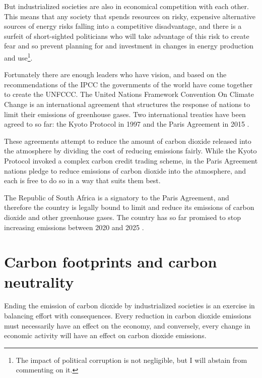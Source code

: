 But industrialized societies are also in economical competition with each other.
This means that any society that spends resources on risky, expensive
alternative sources of energy risks falling into a competitive disadvantage, and
there is a surfeit of short-sighted politicians who will take advantage of
this risk to create fear and so prevent planning for and investment in
changes in energy production and use\footnote{The impact of political corruption
is not negligible, but I will abstain from commenting on it.}.

Fortunately there are enough leaders who have vision, and based on the
recommendations of the IPCC the governments of the world have come together to
create the UNFCCC. The United Nations Framework Convention On Climate Change is
an international agreement that structures the response of nations to limit
their emissions of greenhouse gases. Two international treaties have been agreed
to so far: the Kyoto Protocol in 1997 \autocite{Kyoto1997} and the Paris
Agreement in 2015 \autocite{Paris2015}.

These agreements attempt to reduce the amount of carbon dioxide released into
the atmosphere by dividing the cost of reducing emissions fairly. While the
Kyoto Protocol invoked a complex carbon credit trading scheme, in the Paris
Agreement nations pledge to reduce emissions of carbon dioxide into the
atmosphere, and each is free to do so in a way that suits them best.

The Republic of South Africa is a signatory to the Paris Agreement, and
therefore the country is legally bound to limit and reduce its emissions of
carbon dioxide and other greenhouse gases. The country has so far promised to
stop increasing emissions between 2020 and 2025 \autocite{INDC2016}.


\section{Carbon footprints and carbon neutrality}

Ending the emission of carbon dioxide by industrialized societies is an exercise
in balancing effort with consequences. Every reduction in carbon dioxide
emissions must necessarily have an effect on the economy, and conversely, every
change in economic activity will have an effect on carbon dioxide emissions.

